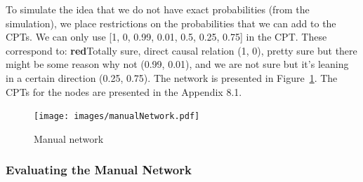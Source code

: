 \documentclass[12pt]{article}
\begin{document}
\begin{enumerate}
 To simulate the idea that we do not have exact probabilities (from the simulation), we place restrictions on the probabilities that we can add to the CPTs. We can only use [1, 0, 0.99, 0.01, 0.5, 0.25, 0.75] in the CPT. These correspond to: \textbf{red}{Totally sure, direct causal relation (1, 0), pretty sure but there might be some reason why not (0.99, 0.01), and we are not sure but it's leaning in a certain direction (0.25, 0.75)}. The network is presented in Figure~\ref{hebben}. The CPTs for the nodes are presented in the Appendix 8.1.
 
 \end{enumerate}
 
 
\begin{figure}[htbp]
\begin{center}
\texttt{[image: images/manualNetwork.pdf]}
\caption{Manual network}
\label{hebben}
\end{center}
\end{figure}


\subsubsection{Evaluating the Manual Network}
\end{document}
